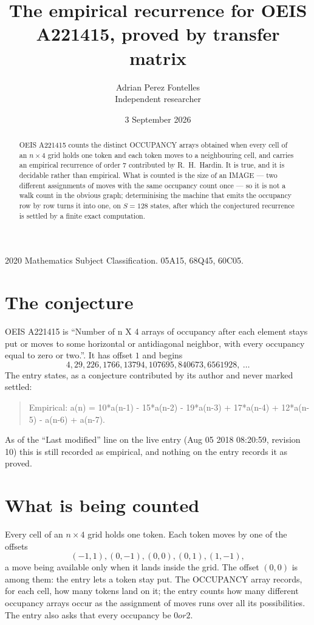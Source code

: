 \documentclass[11pt,a4paper]{article}
\title{The empirical recurrence for OEIS A221415, proved by transfer matrix}
\author{Adrian Perez Fontelles\\ \small Independent researcher}
\date{3 September 2026}
\theoremstyle{plain}
\theoremstyle{definition}
\begin{document}
\maketitle

\begin{abstract}
OEIS A221415 counts the distinct OCCUPANCY arrays obtained when every cell of an $n\times4$ grid
holds one token and each token moves to a neighbouring cell, and carries an empirical
recurrence of order $7$ contributed by R.~H.~Hardin. It is true, and it is decidable
rather than empirical. What is counted is the size of an IMAGE --- two different assignments of
moves with the same occupancy count once --- so it is not a walk count in the obvious graph;
determinising the machine that emits the occupancy row by row turns it into one, on $S=128$
states, after which the conjectured recurrence is settled by a finite exact computation.
\end{abstract}

\noindent\small 2020 Mathematics Subject Classification. 05A15, 68Q45, 60C05.\normalsize

\section{The conjecture}

OEIS A221415 is ``Number of n X 4 arrays of occupancy after each element stays put or moves to some horizontal or antidiagonal neighbor, with every occupancy equal to zero or two.''. It has offset $1$ and begins
\[
4, 29, 226, 1766, 13794, 107695, 840673, 6561928,\ \dots
\]
The entry states, as a conjecture contributed by its author and never marked settled:
\begin{quote}
Empirical: a(n) = 10*a(n-1) - 15*a(n-2) - 19*a(n-3) + 17*a(n-4) + 12*a(n-5) - a(n-6) + a(n-7).
\end{quote}
As of the ``Last modified'' line on the live entry (Aug 05 2018 08:20:59, revision 10) this is still
recorded as empirical, and nothing on the entry records it as proved.

\section{What is being counted}

Every cell of an $n\times4$ grid holds one token. Each token moves by one of the offsets
\[
(-1,1), (0,-1), (0,0), (0,1), (1,-1),
\]
a move being available only when it lands inside the grid. The offset $(0,0)$ is among them: the entry lets a token stay put. The OCCUPANCY array
records, for each cell, how many tokens land on it; the entry counts how many different
occupancy arrays occur as the assignment of moves runs over all its possibilities. The entry also asks that every occupancy be $0 or 2$.
\end{document}
